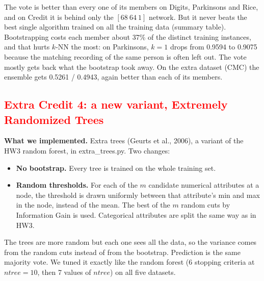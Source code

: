 \documentclass{article}
\begin{document}
The vote is better than every one of its members on Digits, Parkinsons and Rice, and on Credit it is
behind only the $[68\ 64\ 1]$ network. But it never beats the best single algorithm trained on all the training data
(summary table). Bootstrapping costs each member about 37\% of the distinct training instances, and that hurts
$k$-NN the most: on Parkinsons, $k = 1$ drops from 0.9594 to 0.9075 because the matching recording of the same
person is often left out. The vote mostly gets back what the bootstrap took away. On the extra dataset (CMC) the
ensemble gets 0.5261 / 0.4943, again better than each of its members.

\subsection*{\textcolor{red}{Extra Credit 4: a new variant, Extremely Randomized Trees}}

\textbf{What we implemented.} Extra trees (Geurts et al., 2006), a variant of the HW3 random forest, in
extra\_trees.py. Two changes:
\begin{itemize}
\item \textbf{No bootstrap.} Every tree is trained on the whole training set.
\item \textbf{Random thresholds.} For each of the $m$ candidate numerical attributes at a node, the threshold is drawn
uniformly between that attribute's min and max in the node, instead of the mean. The best of the $m$ random cuts by
Information Gain is used. Categorical attributes are split the same way as in HW3.
\end{itemize}
The trees are more random but each one sees all the data, so the variance comes from the random cuts instead of
from the bootstrap. Prediction is the same majority vote. We tuned it exactly like the random forest (6 stopping
criteria at $ntree = 10$, then 7 values of $ntree$) on all five datasets.
\end{document}
